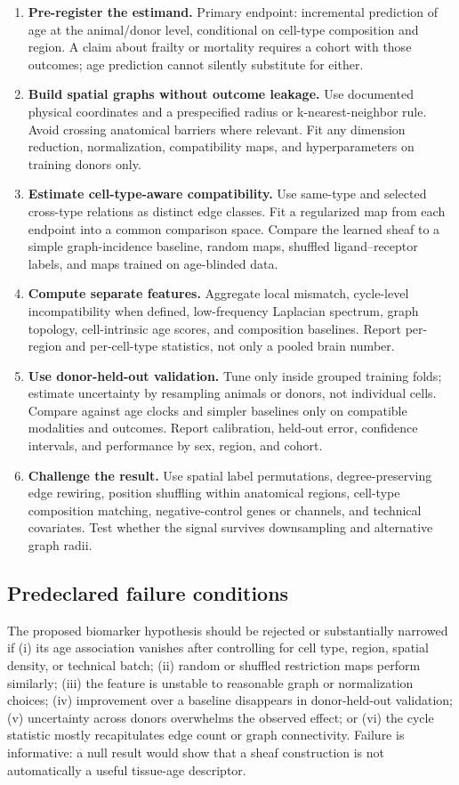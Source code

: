 \documentclass[11pt]{article}
\begin{document}
\begin{enumerate}
\item \textbf{Pre-register the estimand.} Primary endpoint: incremental prediction of age at the animal/donor level, conditional on cell-type composition and region. A claim about frailty or mortality requires a cohort with those outcomes; age prediction cannot silently substitute for either.
\item \textbf{Build spatial graphs without outcome leakage.} Use documented physical coordinates and a prespecified radius or k-nearest-neighbor rule. Avoid crossing anatomical barriers where relevant. Fit any dimension reduction, normalization, compatibility maps, and hyperparameters on training donors only.
\item \textbf{Estimate cell-type-aware compatibility.} Use same-type and selected cross-type relations as distinct edge classes. Fit a regularized map from each endpoint into a common comparison space. Compare the learned sheaf to a simple graph-incidence baseline, random maps, shuffled ligand--receptor labels, and maps trained on age-blinded data.
\item \textbf{Compute separate features.} Aggregate local mismatch, cycle-level incompatibility when defined, low-frequency Laplacian spectrum, graph topology, cell-intrinsic age scores, and composition baselines. Report per-region and per-cell-type statistics, not only a pooled brain number.
\item \textbf{Use donor-held-out validation.} Tune only inside grouped training folds; estimate uncertainty by resampling animals or donors, not individual cells. Compare against age clocks and simpler baselines only on compatible modalities and outcomes. Report calibration, held-out error, confidence intervals, and performance by sex, region, and cohort.
\item \textbf{Challenge the result.} Use spatial label permutations, degree-preserving edge rewiring, position shuffling within anatomical regions, cell-type composition matching, negative-control genes or channels, and technical covariates. Test whether the signal survives downsampling and alternative graph radii.
\end{enumerate}

\subsection{Predeclared failure conditions}
The proposed biomarker hypothesis should be rejected or substantially narrowed if (i) its age association vanishes after controlling for cell type, region, spatial density, or technical batch; (ii) random or shuffled restriction maps perform similarly; (iii) the feature is unstable to reasonable graph or normalization choices; (iv) improvement over a baseline disappears in donor-held-out validation; (v) uncertainty across donors overwhelms the observed effect; or (vi) the cycle statistic mostly recapitulates edge count or graph connectivity. Failure is informative: a null result would show that a sheaf construction is not automatically a useful tissue-age descriptor.
\end{document}

